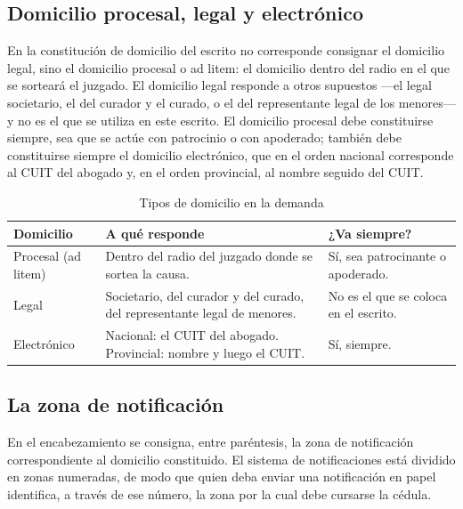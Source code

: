 \documentclass[12pt,oneside]{book}
\begin{document}
\subsection*{Domicilio procesal, legal y electrónico}

En la constitución de domicilio del escrito no corresponde consignar el domicilio legal, sino el domicilio procesal o ad litem: el domicilio dentro del radio en el que se sorteará el juzgado. El domicilio legal responde a otros supuestos —el legal societario, el del curador y el curado, o el del representante legal de los menores— y no es el que se utiliza en este escrito. El domicilio procesal debe constituirse siempre, sea que se actúe con patrocinio o con apoderado; también debe constituirse siempre el domicilio electrónico, que en el orden nacional corresponde al CUIT del abogado y, en el orden provincial, al nombre seguido del CUIT.

\begin{table}[H]
\centering
\caption{Tipos de domicilio en la demanda}
\begin{tabular}{@{}p{3.4cm}p{6.4cm}p{3.2cm}@{}}
\toprule
\textbf{Domicilio} & \textbf{A qué responde} & \textbf{¿Va siempre?} \\
\midrule
Procesal (ad litem) & Dentro del radio del juzgado donde se sortea la causa. & Sí, sea patrocinante o apoderado. \\
Legal & Societario, del curador y del curado, del representante legal de menores. & No es el que se coloca en el escrito. \\
Electrónico & Nacional: el CUIT del abogado. Provincial: nombre y luego el CUIT. & Sí, siempre. \\
\bottomrule
\end{tabular}
\end{table}

\subsection*{La zona de notificación}

En el encabezamiento se consigna, entre paréntesis, la zona de notificación correspondiente al domicilio constituido. El sistema de notificaciones está dividido en zonas numeradas, de modo que quien deba enviar una notificación en papel identifica, a través de ese número, la zona por la cual debe cursarse la cédula.
\end{document}
